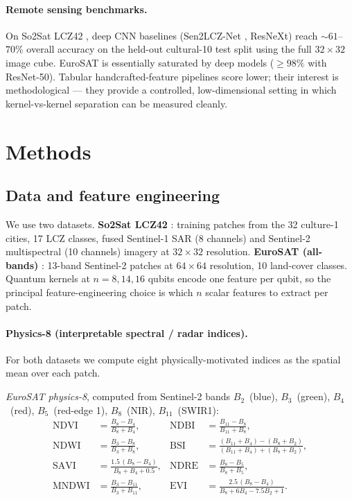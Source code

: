 \documentclass[pdflatex,sn-mathphys]{sn-jnl}
\theoremstyle{plain}
\theoremstyle{remark}
\theoremstyle{definition}
\begin{document}
\paragraph{Remote sensing benchmarks.}
On So2Sat LCZ42 \cite{zhu2020}, deep CNN baselines (Sen2LCZ-Net \cite{qiu2020}, ResNeXt) reach $\sim\!61$--$70\%$ overall accuracy on the held-out cultural-10 test split using the full $32\!\times\!32$ image cube. EuroSAT \cite{helber2019} is essentially saturated by deep models ($\ge 98\%$ with ResNet-50). Tabular handcrafted-feature pipelines score lower; their interest is methodological --- they provide a controlled, low-dimensional setting in which kernel-vs-kernel separation can be measured cleanly.

\section{Methods}\label{sec:methods}

\subsection{Data and feature engineering}\label{sec:features}
We use two datasets. \textbf{So2Sat LCZ42} \cite{zhu2020}: training patches from the 32 culture-1 cities, 17 LCZ classes, fused Sentinel-1 SAR (8 channels) and Sentinel-2 multispectral (10 channels) imagery at $32{\times}32$ resolution. \textbf{EuroSAT (all-bands)} \cite{helber2019}: 13-band Sentinel-2 patches at $64{\times}64$ resolution, 10 land-cover classes. Quantum kernels at $n=8,14,16$ qubits encode one feature per qubit, so the principal feature-engineering choice is which $n$ scalar features to extract per patch.

\paragraph{Physics-8 (interpretable spectral / radar indices).}
For both datasets we compute eight physically-motivated indices as the spatial mean over each patch.

\noindent \emph{EuroSAT physics-8}, computed from Sentinel-2 bands $B_2$~(blue), $B_3$~(green), $B_4$~(red), $B_5$~(red-edge 1), $B_8$~(NIR), $B_{11}$~(SWIR1):
\begin{align*}
\mathrm{NDVI}  &= \frac{B_8 - B_4}{B_8 + B_4}, &
\mathrm{NDBI}  &= \frac{B_{11} - B_8}{B_{11} + B_8}, \\
\mathrm{NDWI}  &= \frac{B_3 - B_8}{B_3 + B_8}, &
\mathrm{BSI}   &= \frac{(B_{11}+B_4) - (B_8+B_2)}{(B_{11}+B_4) + (B_8+B_2)}, \\
\mathrm{SAVI}  &= \frac{1.5\,(B_8 - B_4)}{B_8 + B_4 + 0.5}, &
\mathrm{NDRE}  &= \frac{B_8 - B_5}{B_8 + B_5}, \\
\mathrm{MNDWI} &= \frac{B_3 - B_{11}}{B_3 + B_{11}}, &
\mathrm{EVI}   &= \frac{2.5\,(B_8 - B_4)}{B_8 + 6 B_4 - 7.5 B_2 + 1}.
\end{align*}
\end{document}
